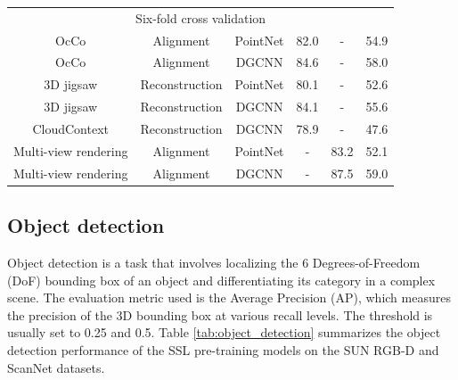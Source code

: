 \documentclass[a4paper,fleqn]{cas-dc}
\begin{document}
\begin{table}[]
{\begin{tabular}{*{6}{c}}
        \midrule
        \multicolumn{6}{c}{Six-fold cross validation} \\
        OcCo \citep{wang2021unsupervised} & Alignment & PointNet & 82.0 & - & 54.9 \\
        OcCo \citep{wang2021unsupervised} & Alignment & DGCNN & 84.6 & - & 58.0 \\
        3D jigsaw \citep{sauder2019self} & Reconstruction & PointNet & 80.1 & - & 52.6 \\
        3D jigsaw \citep{sauder2019self} & Reconstruction & DGCNN & 84.1 & - & 55.6 \\
        CloudContext \citep{sauder2019context} & Reconstruction & DGCNN & 78.9 & - & 47.6 \\
        Multi-view rendering \citep{tran2022self} & Alignment & PointNet & - & 83.2 & 52.1 \\
        Multi-view rendering \citep{tran2022self} & Alignment & DGCNN & - & 87.5 & 59.0 \\
        
        \bottomrule
    \end{tabular}}
\end{table}  


\subsection{Object detection}
Object detection is a task that involves localizing the 6 Degrees-of-Freedom (DoF) bounding box of an object and differentiating its category in a complex scene. The evaluation metric used is the Average Precision (AP), which measures the precision of the 3D bounding box at various recall levels. The threshold is usually set to 0.25 and 0.5. Table \ref{tab:object_detection} summarizes the object detection performance of the SSL pre-training models on the SUN RGB-D \citep{song2015sun} and ScanNet \citep{dai2017scannet} datasets.
\end{document}
